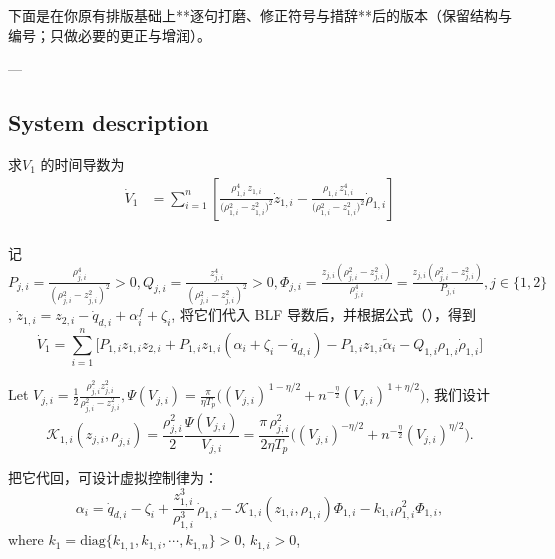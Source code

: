 \documentclass[pdflatex,sn-mathphys-num]{sn-jnl}%
\theoremstyle{thmstyleone}%
\theoremstyle{thmstyletwo}%
\theoremstyle{thmstylethree}%
\begin{document}

下面是在你原有排版基础上**逐句打磨、修正符号与措辞**后的版本（保留结构与编号；只做必要的更正与增润）。

---

\subsection{System description}



求$V_1$ 的时间导数为
\begin{equation}\label{eq:25}
	\begin{aligned}
\dot V_1
&=\sum_{i=1}^{n}\left[
\frac{\rho_{1,i}^4\,z_{1,i}}{\big(\rho_{1,i}^{2}-z_{1,i}^{2}\big)^{2}}\dot z_{1,i}
-
\frac{\rho_{1,i}\,z_{1,i}^{4}}{\big(\rho_{1,i}^{2}-z_{1,i}^{2}\big)^{2}}\dot \rho_{1,i}
\right]\\
\end{aligned}
\end{equation}

记
$
P_{j,i}=\frac{\rho_{j,i}^4}{(\rho_{j,i}^2-z_{j,i}^2)^2}>0,
Q_{j,i}=\frac{ z_{j,i}^4}{(\rho_{j,i}^2-z_{j,i}^2)^2}>0,
\Phi_{j,i}=\frac{z_{j,i}\left(\rho_{j,i}^{2}-z_{j,i}^{2}\right)}{\rho_{j,i}^{4}}=\frac{z_{j,i}(\rho_{j,i}^2-z_{j,i}^2)}{P_{j,i}}, j\in\{1,2\}
$,
$\dot z_{1,i}= z_{2,i}-\dot q_{d,i}+\alpha^{f}_i+\zeta_i$, 将它们代入 BLF 导数后，并根据公式（），得到
$$
\dot V_1=\sum_{i=1}^n\!\Big[P_{1,i} z_{1,i}z_{2,i}+P_{1,i}z_{1,i}(\alpha_i+\zeta_i-\dot q_{d,i})-P_{1,i}z_{1,i}\tilde\alpha_i-Q_{1,i}\rho_{1,i} \dot\rho_{1,i}\Big]
$$

Let ${V_{j,i}}=\frac{1}{2}\frac{\rho_{j,i}^2 z_{j,i}^2}{\rho_{j,i}^2-z_{j,i}^2}, \Psi(V_{j,i})=\frac{\pi}{ \eta T_p}\Big((V_{j,i})^{\,1-\eta/2}+n^{-\frac{\eta}{2} }(V_{j,i})^{\,1+\eta/2}\Big)$, 我们设计
$$
\mathcal{K}_{1,i}(z_{j,i},\rho_{j,i})
=\frac{\rho_{j,i}^2}{2}\frac{\Psi(V_{j,i})}{V_{j,i}}
=\frac{\pi\,\rho_{j,i}^2}{2\eta T_p}\Big((V_{j,i})^{-\eta/2}+n^{-\frac{\eta}{2} }(V_{j,i})^{\eta/2}\Big).
$$

把它代回，可设计虚拟控制律为：
\begin{equation}\label{eq:25}
\alpha_i = \dot q_{d,i}-\zeta_i+\frac{z_{1,i}^3}{\rho_{1,i}^3}\,\dot\rho_{1,i}
-\mathcal{K}_{1,i}(z_{1,i},\rho_{1,i})\Phi_{1,i}
-k_{1,i} \rho_{1,i}^2 \Phi_{1,i},
\end{equation}
where $k_1=\mathrm{diag}\{k_{1,1},k_{1,i},\cdots,k_{1,n}\}>0$, $k_{1,i}>0$,
\end{document}
